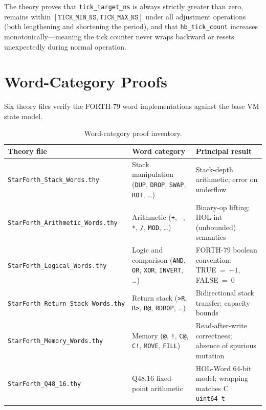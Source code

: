 The theory proves that \texttt{tick\_target\_ns} is always strictly greater
than zero, remains within $[\texttt{TICK\_MIN\_NS}, \texttt{TICK\_MAX\_NS}]$
under all adjustment operations (both lengthening and shortening the period),
and that \texttt{hb\_tick\_count} increases monotonically---meaning the tick
counter never wraps backward or resets unexpectedly during normal operation.

\section{Word-Category Proofs}
\label{vol1:sec:proofs:words}


Six theory files verify the FORTH-79 word implementations against the base
VM state model.

\begin{table}[ht]
\centering
\small
\begin{tabular}{lll}
\toprule
Theory file & Word category & Principal result \\
\midrule
\texttt{StarForth\_Stack\_Words.thy}
  & Stack manipulation (\texttt{DUP}, \texttt{DROP}, \texttt{SWAP}, \texttt{ROT}, \ldots)
  & Stack-depth arithmetic; error on underflow \\
\texttt{StarForth\_Arithmetic\_Words.thy}
  & Arithmetic (\texttt{+}, \texttt{-}, \texttt{*}, \texttt{/}, \texttt{MOD}, \ldots)
  & Binary-op lifting; HOL int (unbounded) semantics \\
\texttt{StarForth\_Logical\_Words.thy}
  & Logic and comparison (\texttt{AND}, \texttt{OR}, \texttt{XOR}, \texttt{INVERT}, \ldots)
  & FORTH-79 boolean convention: TRUE~=~$-1$, FALSE~=~$0$ \\
\texttt{StarForth\_Return\_Stack\_Words.thy}
  & Return stack (\texttt{>R}, \texttt{R>}, \texttt{R@}, \texttt{RDROP}, \ldots)
  & Bidirectional stack transfer; capacity bounds \\
\texttt{StarForth\_Memory\_Words.thy}
  & Memory (\texttt{@}, \texttt{!}, \texttt{C@}, \texttt{C!}, \texttt{MOVE}, \texttt{FILL})
  & Read-after-write correctness; absence of spurious mutation \\
\texttt{StarForth\_Q48\_16.thy}
  & Q48.16 fixed-point arithmetic
  & HOL-Word 64-bit model; wrapping matches C \texttt{uint64\_t} \\
\bottomrule
\end{tabular}
\caption{Word-category proof inventory.}
\label{vol1:tab:proofs:words}
\end{table}

